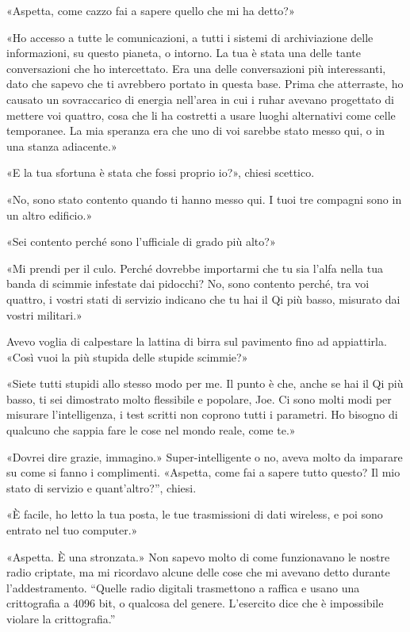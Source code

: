 «Aspetta, come cazzo fai a sapere quello che mi ha detto?»

«Ho accesso a tutte le comunicazioni, a tutti i sistemi di archiviazione
delle informazioni, su questo pianeta, o intorno. La tua è stata una
delle tante conversazioni che ho intercettato. Era una delle
conversazioni più interessanti, dato che sapevo che ti avrebbero portato
in questa base. Prima che atterraste, ho causato un sovraccarico di
energia nell'area in cui i ruhar avevano progettato di mettere voi
quattro, cosa che li ha costretti a usare luoghi alternativi come celle
temporanee. La mia speranza era che uno di voi sarebbe stato messo qui,
o in una stanza adiacente.»

«E la tua sfortuna è stata che fossi proprio io?», chiesi scettico.

«No, sono stato contento quando ti hanno messo qui. I tuoi tre compagni
sono in un altro edificio.»

«Sei contento perché sono l'ufficiale di grado più alto?»

«Mi prendi per il culo. Perché dovrebbe importarmi che tu sia l'alfa
nella tua banda di scimmie infestate dai pidocchi? No, sono contento
perché, tra voi quattro, i vostri stati di servizio indicano che tu hai
il Qi più basso, misurato dai vostri militari.»

Avevo voglia di calpestare la lattina di birra sul pavimento fino ad
appiattirla. «Così vuoi la più stupida delle stupide scimmie?»

«Siete tutti stupidi allo stesso modo per me. Il punto è che, anche se
hai il Qi più basso, ti sei dimostrato molto flessibile e popolare, Joe.
Ci sono molti modi per misurare l'intelligenza, i test scritti non
coprono tutti i parametri. Ho bisogno di qualcuno che sappia fare le
cose nel mondo reale, come te.»

«Dovrei dire grazie, immagino.» Super-intelligente o no, aveva molto da
imparare su come si fanno i complimenti. «Aspetta, come fai a sapere
tutto questo? Il mio stato di servizio e quant'altro?'', chiesi.

«È facile, ho letto la tua posta, le tue trasmissioni di dati wireless,
e poi sono entrato nel tuo computer.»

«Aspetta. È una stronzata.» Non sapevo molto di come funzionavano le
nostre radio criptate, ma mi ricordavo alcune delle cose che mi avevano
detto durante l'addestramento. ``Quelle radio digitali trasmettono a
raffica e usano una crittografia a 4096 bit, o qualcosa del genere.
L'esercito dice che è impossibile violare la crittografia.''

